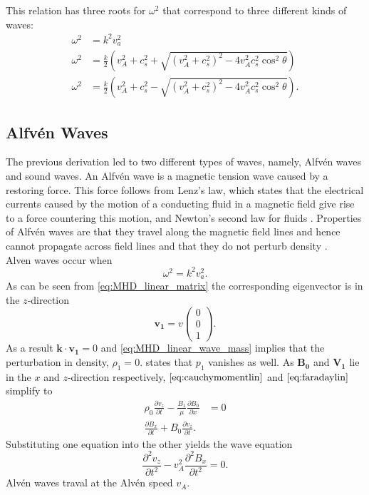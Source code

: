 \documentclass{article}
\begin{document}
This relation has three roots for $\omega^2$ that correspond to three different kinds of waves:
\begin{align*}
	\omega^2 &=  k^2v_a^2 \tag{Alv\'en Waves} \\
	\omega^2 &= \frac{k}{2}\left( v_A^2 + c_s^2 + \sqrt{(v_A^2 + c_s^2)^2 - 4v_A^2c_s^2\cos^2\theta}  \right) \tag{Fast accoustic waves}\\
	\omega^2 &= \frac{k}{2}\left( v_A^2 + c_s^2 - \sqrt{(v_A^2 + c_s^2)^2 - 4v_A^2c_s^2\cos^2\theta}  \right) \tag{Slow accoustic waves}
.\end{align*}
\subsection{Alfv\'en Waves}
The previous derivation led to two different types of waves, namely, Alfv\'en waves and sound waves. An Alfv\'en wave is a magnetic tension wave caused by a restoring force. 
This force follows from Lenz's law, which states that the electrical currents caused by the motion of a conducting fluid in a magnetic field give rise to a force countering this motion, and Newton's second law for fluids \cite{Finlay2007}. 
Properties of Alfv\'en waves are that they travel along the magnetic field lines and hence cannot propagate across field lines and that they do not perturb density \cite{mhdppt}.\\


Alven waves occur when \[
\omega^2 = k^2v_a^2
.\] 
As can be seen from \cref{eq:MHD_linear_matrix} the corresponding eigenvector is in the $z$-direction \[
	\mathbf{v_1} = v \begin{pmatrix} 0 \\ 0 \\ 1 \end{pmatrix} 
.\] 
As a result $\mathbf k \cdot \mathbf{v_1} = 0$ and \cref{eq:MHD_linear_wave_mass} implies that the perturbation in density, $\rho_1  = 0$.  states that $p_1$ vanishes as well. 
As $\mathbf{B_0}$  and $\mathbf{V_1}$ lie in the $x$ and $z$-direction respectively, $\cref{eq:cauchymomentlin}$ and $\cref{eq:faradaylin}$ simplify to
\begin{align*}
	\rho_0 \frac{\partial v_z}{\partial t} - \frac{B_1}{\mu} \frac{\partial B_0}{\partial x} &= 0 \\
	\frac{\partial B_x}{\partial t}  + B_0\frac{\partial v_z}{\partial t} 
.\end{align*}
Substituting one equation into the other yields the wave equation
\[
\frac{\partial^2 v_z}{\partial t^2} - v_A^2 \frac{\partial ^2B_x}{\partial t^2}  = 0
.\] 
Alv\'en waves traval at the Alv\'en speed $v_A$. 
\end{document}
